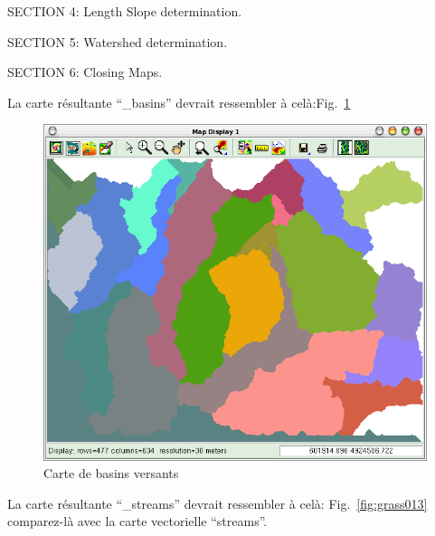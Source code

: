 SECTION 4: Length Slope determination.

SECTION 5: Watershed determination.

SECTION 6: Closing Maps.

La carte r\'esultante ``\_basins'' devrait ressembler \`a cel\`a:Fig.~\ref{fig:grass012}

\begin{figure}[htbp]
   \centering
   \includegraphics[scale=0.35]{grass012.png}
   \caption{Carte de basins versants}
   \label{fig:grass012}
\end{figure}


La carte r\'esultante ``\_streams'' devrait ressembler \`a cel\`a: Fig.~\ref{fig:grass013} comparez-l\`a avec la carte vectorielle ``streams''.

